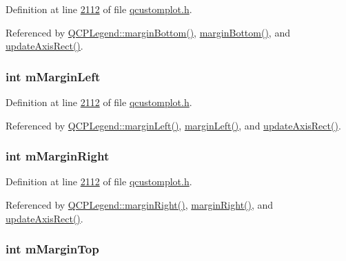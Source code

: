 Definition at line \hyperlink{a00116_source_l02112}{2112} of file \hyperlink{a00116_source}{qcustomplot.\+h}.



Referenced by \hyperlink{a00116_source_l01470}{Q\+C\+P\+Legend\+::margin\+Bottom()}, \hyperlink{a00116_source_l01961}{margin\+Bottom()}, and \hyperlink{a00115_source_l08116}{update\+Axis\+Rect()}.

\hypertarget{a00116_a011307bfbe2ac7e60f13d2fa45e31113}{
\subsubsection[{m\+Margin\+Left}]{\setlength{\rightskip}{0pt plus 5cm}int m\+Margin\+Left}}\label{a00116_a011307bfbe2ac7e60f13d2fa45e31113}


Definition at line \hyperlink{a00116_source_l02112}{2112} of file \hyperlink{a00116_source}{qcustomplot.\+h}.



Referenced by \hyperlink{a00116_source_l01467}{Q\+C\+P\+Legend\+::margin\+Left()}, \hyperlink{a00116_source_l01958}{margin\+Left()}, and \hyperlink{a00115_source_l08116}{update\+Axis\+Rect()}.

\hypertarget{a00116_af5efe5736378d5f8061fd6bf5dc92a2d}{
\subsubsection[{m\+Margin\+Right}]{\setlength{\rightskip}{0pt plus 5cm}int m\+Margin\+Right}}\label{a00116_af5efe5736378d5f8061fd6bf5dc92a2d}


Definition at line \hyperlink{a00116_source_l02112}{2112} of file \hyperlink{a00116_source}{qcustomplot.\+h}.



Referenced by \hyperlink{a00116_source_l01468}{Q\+C\+P\+Legend\+::margin\+Right()}, \hyperlink{a00116_source_l01959}{margin\+Right()}, and \hyperlink{a00115_source_l08116}{update\+Axis\+Rect()}.

\hypertarget{a00116_a746a9e31a0cf3ce3be1bbd3a6fa2c8be}{
\subsubsection[{m\+Margin\+Top}]{\setlength{\rightskip}{0pt plus 5cm}int m\+Margin\+Top}}\label{a00116_a746a9e31a0cf3ce3be1bbd3a6fa2c8be}


